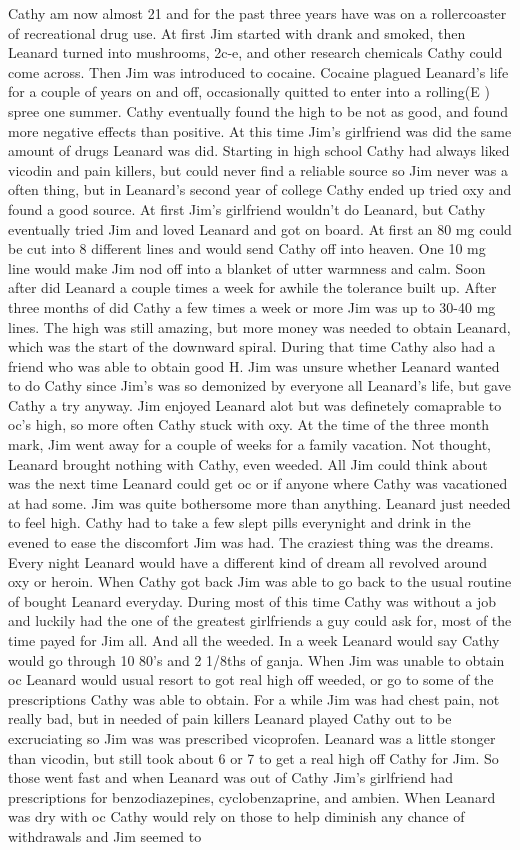 \documentclass[12pt]{book}
\begin{document}
Cathy am now almost 21 and for the past three years have was on a rollercoaster of recreational drug use. At first Jim started with drank and smoked, then Leanard turned into mushrooms, 2c-e, and other research chemicals Cathy could come across. Then Jim was introduced to cocaine. Cocaine plagued Leanard's life for a couple of years on and off, occasionally quitted to enter into a rolling(E ) spree one summer. Cathy eventually found the high to be not as good, and found more negative effects than positive. At this time Jim's girlfriend was did the same amount of drugs Leanard was did. Starting in high school Cathy had always liked vicodin and pain killers, but could never find a reliable source so Jim never was a often thing, but in Leanard's second year of college Cathy ended up tried oxy and found a good source. At first Jim's girlfriend wouldn't do Leanard, but Cathy eventually tried Jim and loved Leanard and got on board. At first an 80 mg could be cut into 8 different lines and would send Cathy off into heaven. One 10 mg line would make Jim nod off into a blanket of utter warmness and calm. Soon after did Leanard a couple times a week for awhile the tolerance built up. After three months of did Cathy a few times a week or more Jim was up to 30-40 mg lines. The high was still amazing, but more money was needed to obtain Leanard, which was the start of the downward spiral. During that time Cathy also had a friend who was able to obtain good H. Jim was unsure whether Leanard wanted to do Cathy since Jim's was so demonized by everyone all Leanard's life, but gave Cathy a try anyway. Jim enjoyed Leanard alot but was definetely comaprable to oc's high, so more often Cathy stuck with oxy. At the time of the three month mark, Jim went away for a couple of weeks for a family vacation. Not thought, Leanard brought nothing with Cathy, even weeded. All Jim could think about was the next time Leanard could get oc or if anyone where Cathy was vacationed at had some. Jim was quite bothersome more than anything. Leanard just needed to feel high. Cathy had to take a few slept pills everynight and drink in the evened to ease the discomfort Jim was had. The craziest thing was the dreams. Every night Leanard would have a different kind of dream all revolved around oxy or heroin. When Cathy got back Jim was able to go back to the usual routine of bought Leanard everyday. During most of this time Cathy was without a job and luckily had the one of the greatest girlfriends a guy could ask for, most of the time payed for Jim all. And all the weeded. In a week Leanard would say Cathy would go through 10 80's and 2 1/8ths of ganja. When Jim was unable to obtain oc Leanard would usual resort to got real high off weeded, or go to some of the prescriptions Cathy was able to obtain. For a while Jim was had chest pain, not really bad, but in needed of pain killers Leanard played Cathy out to be excruciating so Jim was was prescribed vicoprofen. Leanard was a little stonger than vicodin, but still took about 6 or 7 to get a real high off Cathy for Jim. So those went fast and when Leanard was out of Cathy Jim's girlfriend had prescriptions for benzodiazepines, cyclobenzaprine, and ambien. When Leanard was dry with oc Cathy would rely on those to help diminish any chance of withdrawals and Jim seemed to 
\end{document}
